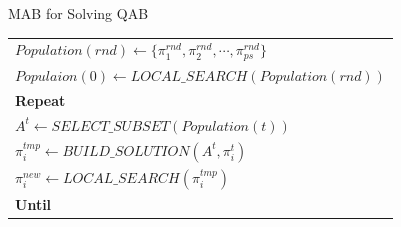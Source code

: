 \documentclass{beamer}
\begin{document}
\begin{frame}[t]{MAB for Solving QAB} %
\footnotesize
\begin{center}
\begin{tabular}{ l }
$Population(rnd)\leftarrow\{\pi_{1}^{rnd},\pi_{2}^{rnd},\cdots,\pi_{ps}^{rnd}\}$\\ 
$Populaion(0)\leftarrow LOCAL\_SEARCH(Population(rnd))$\\  
\textbf{Repeat}\\
$A^t\leftarrow SELECT\_SUBSET(Population(t))$\\
$\pi_{i}^{tmp}\leftarrow BUILD\_SOLUTION(A^t,\pi_{i}^{t})$\\
$\pi_{i}^{new}\leftarrow LOCAL\_SEARCH(\pi_{i}^{tmp})$\\  

\textbf{Until}
\end{tabular}
\end{center}
\end{frame}
\end{document}
